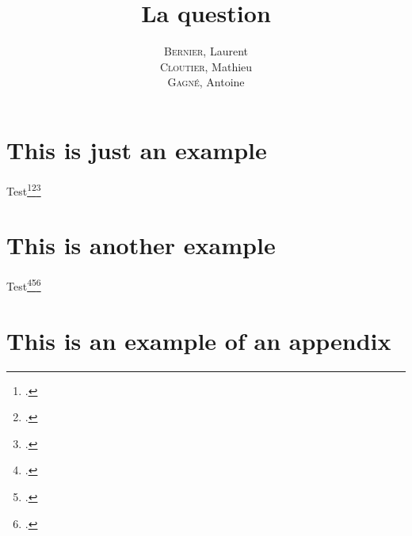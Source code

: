 \documentclass[12pt]{GDD}
\author{%
    \textsc{Bernier}, Laurent \\%
    \textsc{Cloutier}, Mathieu \\%
    \textsc{Gagné}, Antoine%
}
\title{La question}
\begin{document}
\chapter{This is just an example}
\lipsum%
Test\footcite{foo12}\footcite{test}\footcite{Poincare:1968-ORIG}

\chapter{This is another example}
\lipsum%
Test\footcite{foo12}\footcite{test}\footcite{Poincare:1968-ORIG}

\printbibliography[heading=bibintoc]%

\appendix

\chapter{This is an example of an appendix}
\lipsum%
\end{document}
